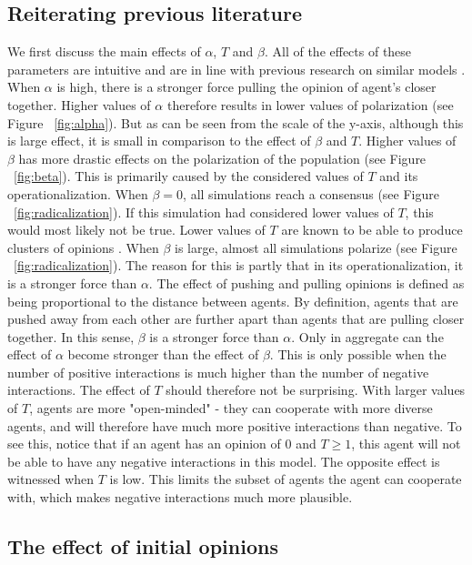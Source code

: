 \documentclass{article}
\begin{document}
\subsection{Reiterating previous literature}

We first discuss the main effects of $\alpha$, $T$ and $\beta$. All of the effects of these parameters are intuitive and are in line with previous research on similar models \cite{flache_models_2017}. When $\alpha$ is high, there is a stronger force pulling the opinion of agent's closer together. Higher values of $\alpha$ therefore results in lower values of polarization (see Figure ~\ref{fig:alpha}). 
But as can be seen from the scale of the y-axis, although this is large effect, it is small in comparison to the effect of $\beta$ and $T$. Higher values of $\beta$ has more drastic effects on the polarization of the population (see Figure ~\ref{fig:beta}). 
This is primarily caused by the considered values of $T$ and its operationalization. When $\beta = 0$, all simulations reach a consensus (see Figure ~\ref{fig:radicalization}). If this simulation had considered lower values of $T$, this would most likely not be true. Lower values of $T$ are known to be able to produce clusters of opinions \cite{flache_models_2017,sasahara_social_2021}. When $\beta$ is large, almost all simulations polarize (see Figure ~\ref{fig:radicalization}). The reason for this is partly that in its operationalization, it is a stronger force than $\alpha$. The effect of pushing and pulling opinions is defined as being proportional to the distance between agents. 
By definition, agents that are pushed away from each other are further apart than agents that are pulling closer together. In this sense, $\beta$ is a stronger force than $\alpha$. Only in aggregate can the effect of $\alpha$ become stronger than the effect of $\beta$. This is only possible when the number of positive interactions is much higher than the number of negative interactions. The effect of $T$ should therefore not be surprising. With larger values of $T$, agents are more "open-minded" - they can cooperate with more diverse agents, and will therefore have much more positive interactions than negative. To see this, notice that if an agent has an opinion of 0 and $T\geq1$, this agent will not be able to have any negative interactions in this model. The opposite effect is witnessed when $T$ is low. This limits the subset of agents the agent can cooperate with, which makes negative interactions much more plausible.

\subsection{The effect of initial opinions}
\end{document}
